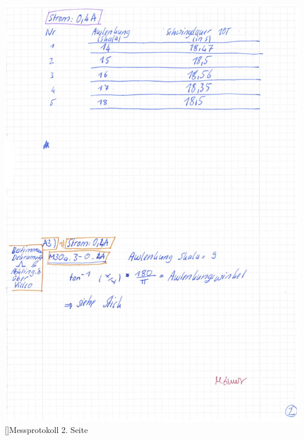 \documentclass[12pt,a4paper,]{scrreprt}
\begin{document}
\begin{center}
    	\includegraphics[scale=0.33]{2.jpg}
    	[]{Messprotokoll 2. Seite}
    	\pagebreak

\end{center}
\end{document}
